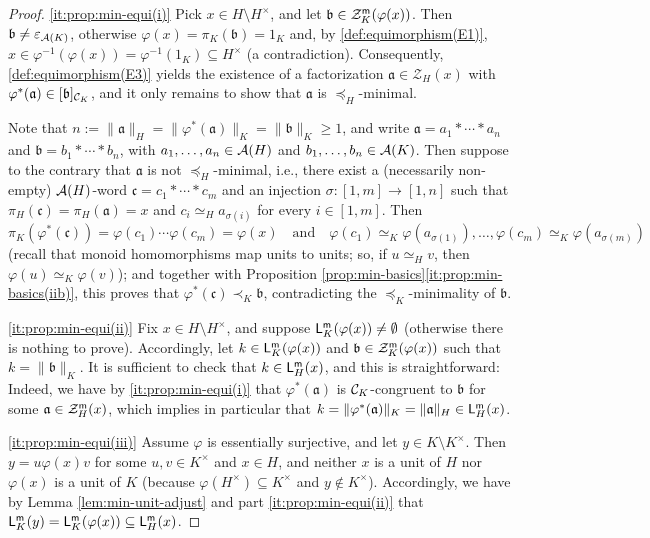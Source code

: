 \begin{proof}
	\ref{it:prop:min-equi(i)}
	Pick $x\in H \setminus H^\times$, and let $\mathfrak b \in \mathcal{Z}_K^{\mathsf{m}}(\varphi(x))$. Then $\mathfrak b \ne \varepsilon_{\mathcal{A}(K)}$, otherwise $\varphi(x) = \pi_K(\mathfrak b) = 1_K$ and, by \ref{def:equimorphism(E1)}, $x \in \varphi^{-1}(\varphi(x)) = \varphi^{-1}(1_K) \subseteq H^\times$ (a contradiction). Consequently, \ref{def:equimorphism(E3)} yields the existence of a factorization $\mathfrak{a}\in \mathcal{Z}_H(x)$ with $\varphi^*(\mathfrak{a}) \in [ \mathfrak{b} ]_{\mathcal{C}_K}$, and it only remains to show that $\mathfrak a$ is $\preceq_H$-minimal. 
	
	{Note that} $n := \|\mathfrak a\|_H = \|\varphi^\ast(\mathfrak a)\|_K = \|\mathfrak b\|_K \ge 1$, and write $\mathfrak a = a_1 \ast \cdots \ast a_n$ and $\mathfrak b = b_1 \ast \cdots \ast b_n$, with $a_1, \ldots, a_n \in \mathcal{A}(H)$ and $b_1, \ldots, b_n \in \mathcal{A}(K)$. Then suppose to the contrary that $\mathfrak a$ is not $\preceq_H$-minimal, i.e., there exist a (necessarily non-empty) $\mathcal{A}(H)$-word $\mathfrak{c} = c_1 \ast \cdots \ast c_m$ and an injection $\sigma: [ 1, m ] \to [ 1, n ]$ such that $\pi_H(\mathfrak c) = \pi_H(\mathfrak a) = x$ and $c_i \simeq_H a_{\sigma(i)}$ for every $i \in [ 1, m ]$. Then
	\[
	\pi_K(\varphi^\ast(\mathfrak c)) = \varphi(c_1) \cdots \varphi(c_m) = \varphi(x)
	\quad\text{and}\quad
	\varphi(c_1) \simeq_K \varphi(a_{\sigma(1)}), \ldots, \varphi(c_m) \simeq_K \varphi(a_{\sigma(m)})
	\]
	(recall that monoid hom\-o\-mor\-phisms map units to units; so, if $u \simeq_H v$, then $\varphi(u) \simeq_K \varphi(v)$); and together with Proposition \ref{prop:min-basics}\ref{it:prop:min-basics(iib)}, this proves that 
	$\varphi^\ast(\mathfrak c) \prec_K \mathfrak b$, contradicting the $\preceq_K$-minimality of $\mathfrak b$.
	
	\ref{it:prop:min-equi(ii)} Fix $x \in H \setminus H^\times$, and suppose $\mathsf{L}_K^{\mathsf{m}}(\varphi(x)) \ne \emptyset$ (otherwise there is nothing to prove). Accordingly, let $k \in \mathsf{L}_K^{\mathsf{m}}(\varphi(x))$ and $\mathfrak b \in \mathcal Z_K^{\mathsf{m}}(\varphi(x))$ such that $k = \|\mathfrak b\|_K$. It is sufficient to check that $k \in \mathsf L_H^{\mathsf{m}}(x)$, and this is straightforward: Indeed, we have by \ref{it:prop:min-equi(i)} that $\varphi^\ast(\mathfrak a)$ is $\mathcal{C}_K$-congruent to $\mathfrak b$ for some $\mathfrak a \in \mathcal Z_H^{\mathsf{m}}(x)$, which implies in particular that $k = \|\varphi^\ast(\mathfrak a)\|_K = \|\mathfrak a\|_H \in \mathsf L_H^{\mathsf{m}}(x)$.
	
	\ref{it:prop:min-equi(iii)} Assume $\varphi$ is essentially surjective, and let $y \in K \setminus K^\times$. Then $y = u \varphi(x) v$ for some $u,v\in K^\times$ and $x\in H$, and neither $x$ is a unit of $H$ nor $\varphi(x)$ is a unit of $K$ (because $\varphi(H^\times) \subseteq K^\times$ and $y \notin K^\times$). Accordingly, we have by Lemma \ref{lem:min-unit-adjust} and part \ref{it:prop:min-equi(ii)} that $\mathsf{L}_K^{\mathsf{m}}(y) = \mathsf{L}_K^{\mathsf{m}}(\varphi(x)) \subseteq \mathsf{L}_H^{\mathsf{m}}(x)$.
\end{proof}
%

